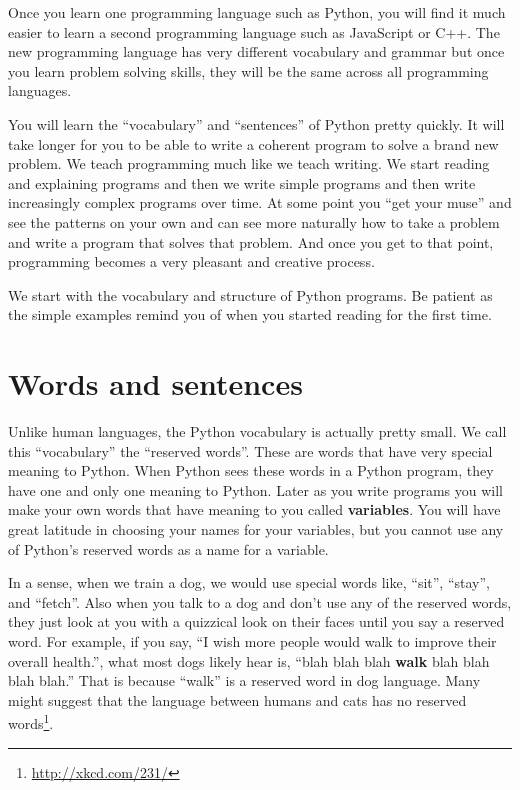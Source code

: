 \documentclass[11pt]{book}
\begin{document}
Once you learn one programming language such as Python, you will 
find it much easier to learn a second programming language such
as JavaScript or C++.  The new programming language has very different 
vocabulary and grammar but once you learn problem solving skills, 
they will be the same across all programming languages.

You will learn the ``vocabulary'' and ``sentences'' of Python pretty quickly.
It will take longer for you to be able to write a coherent program
to solve a brand new problem.  We teach programming much like we teach
writing.  We start reading and explaining programs and then we write 
simple programs and then write increasingly complex programs over time.
At some point you ``get your muse'' and see the patterns on your own
and can see more naturally how to take a problem and 
write a program that solves that problem.  And once you get 
to that point, programming becomes a very pleasant and creative process.  

We start with the vocabulary and structure of Python programs.  Be patient
as the simple examples remind you of when you started reading for the first
time. 

\section{Words and sentences}

Unlike human languages, the Python vocabulary is actually pretty small.
We call this ``vocabulary'' the ``reserved words''.  These are words that
have very special meaning to Python.  When Python sees these words in 
a Python program, they have one and only one meaning to Python.  Later
as you write programs you will make your own words that have meaning to 
you called {\bf variables}.   You will have great latitude in choosing
your names for your variables, but you cannot use any of Python's 
reserved words as a name for a variable.

In a sense, when we train a dog, we would use special words like,
``sit'', ``stay'', and ``fetch''.  Also when you talk to a dog and
don't use any of the reserved words, they just look at you with a 
quizzical look on their faces until you say a reserved word.  
For example, if you say, 
``I wish more people would walk to improve their overall health.'', 
what most dogs likely hear is,
``blah blah blah {\bf walk} blah blah blah blah.''
That is because ``walk'' is a reserved word in dog language.  Many
might suggest that the language between humans and cats has no
reserved words\footnote{\url{http://xkcd.com/231/}}.
\end{document}
